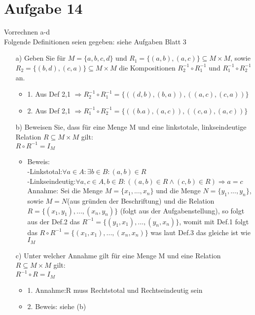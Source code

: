 \documentclass[paper = a4, ngerman]{scrartcl}
\begin{document}
\section*{Aufgabe 14}
Vorrechnen a-d\\
	Folgende Definitionen seien gegeben: siehe Aufgaben Blatt 3\\
	\begin{itemize}
		\item [a)] Geben Sie für $M = \{a,b,c,d\}$ und $R_1=\{(a,b),(a,c)\} \subseteq M \times M$, sowie\\ $R_2=\{(b,d),(c,a)\} \subseteq M \times M$ die Kompositionen $R_{2}^{-1} \circ R_{1}^{-1}$ und $R_{1}^{-1} \circ R_{2}^{-1}$ an.
			\begin{itemize}
				\item 1. Aus Def 2,1 $\Rightarrow R_{2}^{-1} \circ R_{1}^{-1} =\{((d,b),(b,a)),((a,c),(c,a))\}$
				\item 2. Aus Def 2,1 $\Rightarrow R_{1}^{-1} \circ R_{2}^{-1} =\{((b.a),(a,c)),((c,a),(a,c))\}$
			\end{itemize}
		\pagebreak
		\item [b)] Beweisen Sie, dass für eine Menge M und eine linkstotale, linkseindeutige Relation $R \subseteq M \times M$ gilt:\\ 
		$R \circ R^{-1} = I_M$
			\begin{itemize}
				\item Beweis:\\
				-Linkstotal:$\forall a \in A: \exists b \in B: (a,b) \in R$\\
				-Linkseindeutig:$\forall a,c \in A ,b \in B: ((a,b) \in R \wedge (c,b)\in R) \Rightarrow a=c$\\
				Annahme: Sei die Menge $M=\{x_1,...,x_n\}$ und die Menge $N=\{y_1,...,y_n\}$, sowie $M=N$(aus gründen der Beschriftung) und die Relation $R=\{(x_1,y_1),...,(x_n,y_n)\}$ (folgt aus der Aufgabenstellung), so folgt aus der Def.2 das $R^{-1}=\{(y_1,x_1),...,(y_n,x_n)\}$, womit mit Def.1 folgt das $R \circ R^{-1} = \{(x_1,x_1),...,(x_n,x_n)\}$ was laut Def.3 das gleiche ist wie $I_M$		
			\end{itemize}
		\item [c)] Unter welcher Annahme gilt für eine Menge M und eine Relation $R \subseteq M \times M$ gilt:\\
		 $R^{-1} \circ R = I_M$
		 	    \begin{itemize}
		 	    	\item 1. Annahme:R muss Rechtstotal und Rechtseindeutig sein
		 	    	\item 2. Beweis: siehe (b)

\end{itemize}
\end{itemize}
\end{document}
